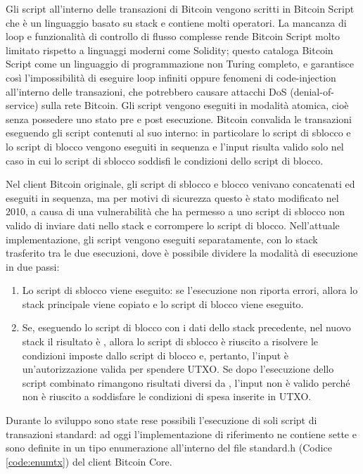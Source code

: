 Gli script all’interno delle transazioni di Bitcoin vengono scritti in Bitcoin Script che è un linguaggio basato su stack e contiene molti operatori.
La mancanza di loop e funzionalità di controllo di flusso complesse rende Bitcoin Script molto limitato rispetto a linguaggi moderni come Solidity; questo cataloga Bitcoin Script come un linguaggio di programmazione non Turing completo, e garantisce così l’impossibilità di eseguire loop infiniti oppure fenomeni di code-injection all’interno delle transazioni, che potrebbero causare attacchi DoS (denial-of-service) sulla rete Bitcoin.\newline
Gli script vengono eseguiti in modalità atomica, cioè senza possedere uno stato pre e post esecuzione. Bitcoin convalida le transazioni eseguendo gli script contenuti al suo interno: in particolare lo script di sblocco e lo script di blocco vengono eseguiti in sequenza e l'input risulta valido solo nel caso in cui lo script di sblocco soddisfi le condizioni dello script di blocco.

Nel client Bitcoin originale, gli script di sblocco e blocco venivano concatenati ed eseguiti in sequenza, ma per motivi di sicurezza questo è stato modificato nel 2010, a causa di una vulnerabilità che ha permesso a uno script di sblocco non valido di inviare dati nello stack e corrompere lo script di blocco.
Nell'attuale implementazione, gli script vengono eseguiti separatamente, con lo stack trasferito tra le due esecuzioni, dove è possibile dividere la modalità di esecuzione in due passi:

\begin{enumerate}
  \item Lo script di sblocco viene eseguito: se l’esecuzione non riporta errori, allora lo stack principale viene copiato e lo script di blocco viene eseguito.
  \item Se, eseguendo lo script di blocco con i dati dello stack precedente, nel nuovo stack il risultato è , allora lo script di sblocco è riuscito a risolvere le condizioni imposte dallo script di blocco e, pertanto, l'input è un'autorizzazione valida per spendere UTXO. Se dopo l'esecuzione dello script combinato rimangono risultati diversi da , l'input non è valido perché non è riuscito a soddisfare le condizioni di spesa inserite in UTXO.
\end{enumerate}

Durante lo sviluppo sono state rese possibili l’esecuzione di soli script di transazioni standard: ad oggi l’implementazione di riferimento ne contiene sette e sono definite in un tipo enumerazione all’interno del file standard.h (Codice \ref{code:enumtx}) del client Bitcoin Core.

